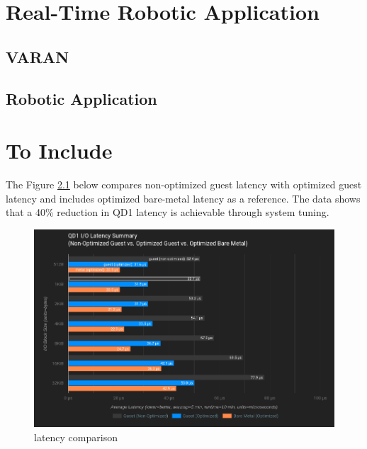 \documentclass[MMR,Master,english]{twbook}
\begin{document}
\chapter{Real-Time Robotic Application}\label{cha:real-time-testing}

\section{VARAN}
\clearpage
\section{Robotic Application}
\clearpage

\chapter{To Include}\label{cha:to_include}

The Figure \ref{fig:latency_comparison} below compares non-optimized guest latency with optimized guest latency and includes optimized bare-metal latency as a reference. The data shows that a 40\% reduction in QD1 latency is achievable through system tuning.



\begin{figure}[H]
	\centering
	\includegraphics[width=1.0\columnwidth]{img/latency_comparison.png}
	\caption[latency comparison]{latency comparison}
	\label{fig:latency_comparison}
\end{figure}
\clearpage
\end{document}
